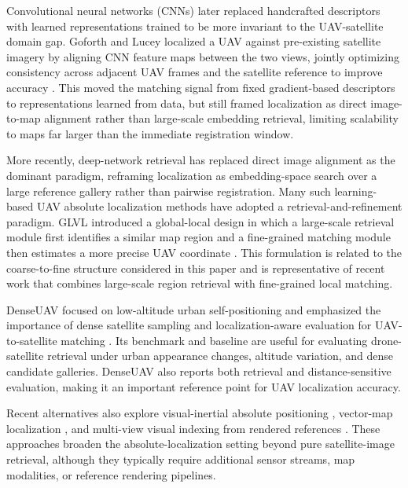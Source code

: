 \documentclass[conference]{IEEEtran}
\begin{document}
Convolutional neural networks (CNNs) later replaced handcrafted descriptors
with learned representations trained to be more invariant to the UAV-satellite
domain gap. Goforth and Lucey localized a UAV against pre-existing satellite
imagery by aligning CNN feature maps between the two views, jointly
optimizing consistency across adjacent UAV frames and the satellite
reference to improve accuracy \cite{goforth2019gpsdenied}. This moved the
matching signal from fixed gradient-based descriptors to representations
learned from data, but still framed localization as direct image-to-map
alignment rather than large-scale embedding retrieval, limiting scalability
to maps far larger than the immediate registration window.

More recently, deep-network retrieval has replaced direct image alignment as
the dominant paradigm, reframing localization as embedding-space search over
a large reference gallery rather than pairwise registration. Many such
learning-based UAV absolute localization methods have adopted a
retrieval-and-refinement paradigm. GLVL introduced a
global-local design in which a large-scale retrieval module first identifies a
similar map region and a fine-grained matching module then estimates a more
precise UAV coordinate \cite{li2023glvl}. This formulation is related to the
coarse-to-fine structure considered in this paper and is representative of
recent work that combines large-scale region retrieval with fine-grained local
matching.

DenseUAV focused on low-altitude urban self-positioning and emphasized the
importance of dense satellite sampling and localization-aware evaluation for
UAV-to-satellite matching \cite{dai2024denseuav}. Its benchmark and baseline
are useful for evaluating drone-satellite retrieval under urban appearance
changes, altitude variation, and dense candidate galleries. DenseUAV also
reports both retrieval and distance-sensitive evaluation, making it an
important reference point for UAV localization accuracy.

Recent alternatives also explore visual-inertial absolute positioning
\cite{tong2025rtapm}, vector-map localization \cite{hao2025vecmaploc}, and
multi-view visual indexing from rendered references \cite{li2025viewpoint}.
These approaches broaden the absolute-localization setting beyond pure
satellite-image retrieval, although they typically require additional sensor
streams, map modalities, or reference rendering pipelines.
\end{document}
